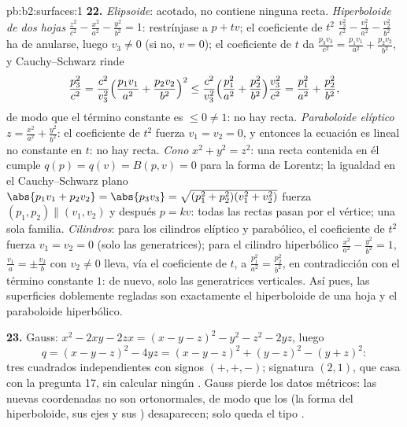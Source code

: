 \begin{solution}{pb:b2:surfaces:1}
\textbf{22.} \emph{Elipsoide}: acotado, no contiene ninguna recta.
\emph{Hiperboloide de dos hojas} $\frac{z^2}{c^2} - \frac{x^2}{a^2} -
\frac{y^2}{b^2} = 1$: restrínjase a $p + tv$; el coeficiente de $t^2$
$\frac{v_3^2}{c^2} - \frac{v_1^2}{a^2} - \frac{v_2^2}{b^2}$ ha de
anularse, luego $v_3 \neq 0$ (si no, $v = 0$); el coeficiente de $t$
da $\frac{p_3v_3}{c^2} = \frac{p_1v_1}{a^2} + \frac{p_2v_2}{b^2}$, y
Cauchy--Schwarz rinde
\[
\frac{p_3^2}{c^2}
= \frac{c^2}{v_3^2}\Bigl(\frac{p_1v_1}{a^2} +
\frac{p_2v_2}{b^2}\Bigr)^2
\leq \frac{c^2}{v_3^2}\Bigl(\frac{p_1^2}{a^2} +
\frac{p_2^2}{b^2}\Bigr)\frac{v_3^2}{c^2}
= \frac{p_1^2}{a^2} + \frac{p_2^2}{b^2},
\]
de modo que el término constante es $\leq 0 \neq 1$: no hay recta.
\emph{Paraboloide elíptico} $z = \frac{x^2}{a^2} + \frac{y^2}{b^2}$:
el coeficiente de $t^2$ fuerza $v_1 = v_2 = 0$, y entonces la
ecuación es lineal no constante en $t$: no hay recta. \emph{Cono}
$x^2 + y^2 = z^2$: una recta contenida en él cumple $q(p) = q(v) =
B(p, v) = 0$ para la forma de Lorentz; la igualdad en el
Cauchy--Schwarz plano $\abs{p_1v_1 + p_2v_2} = \abs{p_3v_3} =
\sqrt{(p_1^2 + p_2^2)(v_1^2 + v_2^2)}$ fuerza $(p_1, p_2) \parallel
(v_1, v_2)$ y después $p = kv$: todas las rectas pasan por el
vértice; una sola familia. \emph{Cilindros}: para los cilindros
elíptico y parabólico, el coeficiente de $t^2$ fuerza $v_1 = v_2 = 0$
(solo las generatrices); para el cilindro hiperbólico
$\frac{x^2}{a^2} - \frac{y^2}{b^2} = 1$, $\frac{v_1}a = \pm
\frac{v_2}b$ con $v_2 \neq 0$ lleva, vía el coeficiente de $t$, a
$\frac{p_1^2}{a^2} = \frac{p_2^2}{b^2}$, en contradicción con el
término constante $1$: de nuevo, solo las generatrices verticales.
Así pues, las superficies  doblemente regladas son
exactamente el hiperboloide de una hoja y el paraboloide
hiperbólico.

\textbf{23.} Gauss: $x^2 - 2xy - 2zx = (x - y - z)^2 - y^2 - z^2 -
2yz$, luego
\[
q = (x - y - z)^2 - 4yz = (x - y - z)^2 + (y - z)^2 - (y +
z)^2 :
\]
tres cuadrados independientes con signos $(+, +, -)$; signatura $(2,
1)$, que casa con la pregunta 17, sin calcular ningún
. Gauss pierde los datos métricos: las nuevas
coordenadas no son ortonormales, de modo que los  (la
forma del hiperboloide, sus ejes y sus ) desaparecen; solo
queda el tipo .


\end{solution}
